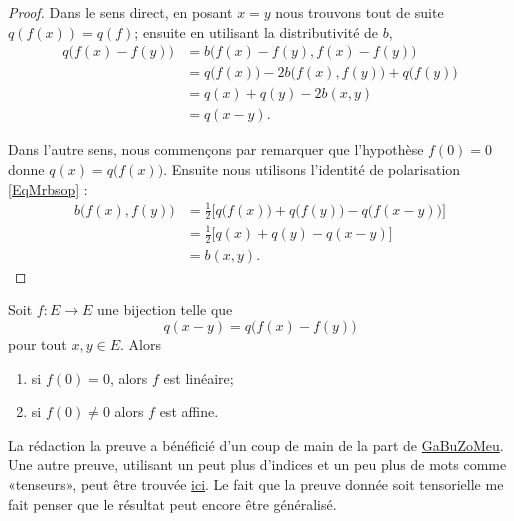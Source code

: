 \begin{proof}
    Dans le sens direct, en posant \( x=y\) nous trouvons tout de suite \( q(f(x))=q(f)\); ensuite en utilisant la distributivité de \( b\),
    \begin{subequations}
        \begin{align}
            q\big( f(x)-f(y) \big)&=b\big( f(x)-f(y),f(x)-f(y) \big)\\
            &=q\big( f(x) \big)-2b\big( f(x),f(y) \big)+q\big( f(y) \big)\\
            &=q(x)+q(y)-2b(x,y)\\
            &=q(x-y).
        \end{align}
    \end{subequations}
    
    Dans l'autre sens, nous commençons par remarquer que l'hypothèse \( f(0)=0\) donne \( q(x)=q\big( f(x) \big)\). Ensuite nous utilisons l'identité de polarisation \eqref{EqMrbsop} :
    \begin{subequations}
        \begin{align}
            b\big( f(x),f(y) \big)&=\frac{ 1 }{2}\big[ q\big( f(x) \big)+q\big( f(y) \big)-q\big( f(x-y) \big) \big]\\
            &=\frac{ 1 }{2}\big[ q(x)+q(y)-q(x-y) \big]\\
            &=b(x,y).
        \end{align}
    \end{subequations}
\end{proof}

\begin{theorem}     \label{ThoDsFErq}
    Soit \( f\colon E\to E\) une bijection telle que
    \begin{equation}
        q(x-y)=q\big( f(x)-f(y) \big)
    \end{equation}
    pour tout \( x,y\in E\). Alors
    \begin{enumerate}
        \item
            si \( f(0)=0\), alors \( f\) est linéaire;
        \item
            si \( f(0)\neq 0\) alors \( f\) est affine.
    \end{enumerate}
\end{theorem}
La rédaction la preuve a bénéficié d'un coup de main de la part de \href{http://www.ilemaths.net/forum-sujet-500814.html}{GaBuZoMeu}. Une autre preuve, utilisant un peut plus d'indices et un peu plus de mots comme «tenseurs», peut être trouvée  \href{http://physics.stackexchange.com/questions/12664/proving-that-interval-preserving-transformations-are-linear}{ici}. Le fait que la preuve donnée soit tensorielle me fait penser que le résultat peut encore être généralisé.

